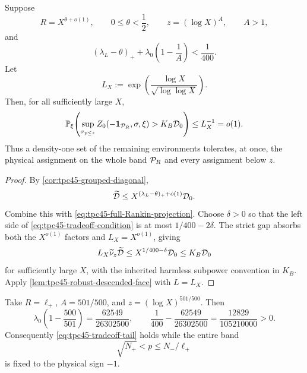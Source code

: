 \begin{theorem}
\label{thm:tpc45-band-cutoff-tradeoff}
Suppose
\begin{equation}
 R=X^{\theta+o(1)},
 \qquad 0\le\theta<\frac12,
 \qquad z=(\log X)^A,\qquad A>1,
 \label{eq:tpc45-tradeoff-parameters}
\end{equation}
and
\begin{equation}
 \boxed{
 (\lambda_L-\theta)_+
 +\lambda_0\left(1-\frac1A\right)
 <\frac1{400}.}
 \label{eq:tpc45-tradeoff-condition}
\end{equation}
Let
\begin{equation}
 L_X:=\exp\!\left(
  \frac{\log X}{\sqrt{\log\log X}}
 \right).
 \label{eq:tpc45-LX}
\end{equation}
Then, for all sufficiently large \(X\),
\begin{equation}
 \mathbb P_\xi\!\left(
  \sup_{\sigma_{p\le z}}
  Z_0(-\mathbf 1_{\mathcal P_R},\sigma,\xi)>K_B\mathcal D_0
 \right)
 \le L_X^{-1}=o(1).
 \label{eq:tpc45-tradeoff-tail}
\end{equation}
Thus a density-one set of the remaining environments tolerates, at
once, the physical assignment on the whole band \(\mathcal P_R\) and every
assignment below \(z\).
\end{theorem}

\begin{proof}
By \cref{cor:tpc45-grouped-diagonal},
\begin{equation}
 \widetilde{\mathcal D}
 \le X^{(\lambda_L-\theta)_++o(1)}\mathcal D_0.
 \label{eq:tpc45-tradeoff-diagonal}
\end{equation}
Combine this with \eqref{eq:tpc45-full-Rankin-projection}.  Choose
\(\delta>0\) so that the left side of
\eqref{eq:tpc45-tradeoff-condition} is at most
\(1/400-2\delta\).  The strict gap absorbs both the \(X^{o(1)}\)
factors and \(L_X=X^{o(1)}\), giving
\begin{equation}
 L_X\widetilde\nu_z\widetilde{\mathcal D}
 \le X^{1/400-\delta}\mathcal D_0
 \le K_B\mathcal D_0
 \label{eq:tpc45-tradeoff-budget}
\end{equation}
for sufficiently large \(X\), with the inherited harmless
subpower convention in \(K_B\).  Apply
\cref{lem:tpc45-robust-descended-face} with \(L=L_X\).
\end{proof}

\begin{corollary}
\label{cor:tpc45-clean-balanced-freezing}
Take \(R=\ell_+\), \(A=501/500\), and
\(z=(\log X)^{501/500}\).  Then
\begin{equation}
 \lambda_0\left(1-\frac{500}{501}\right)
 =\frac{62549}{26302500},
 \qquad
 \frac1{400}-\frac{62549}{26302500}
 =\frac{12829}{105210000}>0.
 \label{eq:tpc45-clean-balanced-margin}
\end{equation}
Consequently \eqref{eq:tpc45-tradeoff-tail} holds while the entire
band
\begin{equation}
 \sqrt{N_+}<p\le N_-/\ell_+
 \label{eq:tpc45-clean-balanced-band-explicit}
\end{equation}
is fixed to the physical sign \(-1\).
\end{corollary}

